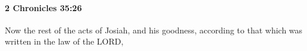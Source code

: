 
		\paragraph{2 Chronicles 35:26} %
			\label{2CHRONICLES-35-26}

			Now the rest of the acts of Josiah, and his goodness, according to that which was written in the law of the LORD,


